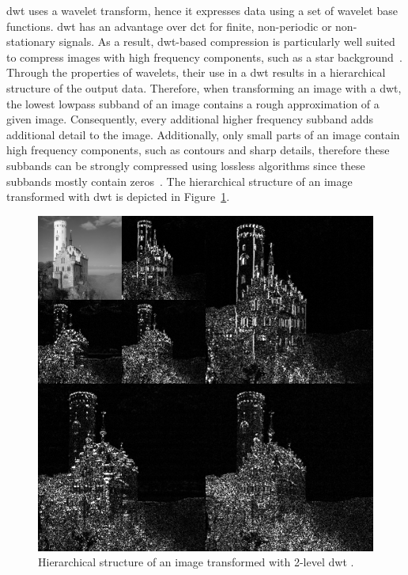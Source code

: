 \Gls{dwt} uses a wavelet transform, hence it expresses data using a set of wavelet base functions. \gls{dwt} has an advantage over \gls{dct} for finite, non-periodic or non-stationary signals. As a result, \gls{dwt}-based compression is particularly well suited to compress images with high frequency components, such as a star background~\cite{Bocharova2009CompressionMultimedia}. Through the properties of wavelets, their use in a \gls{dwt} results in a hierarchical structure of the output data. Therefore, when transforming an image with a \gls{dwt}, the lowest lowpass subband of an image contains a rough approximation of a given image. Consequently, every additional higher frequency subband adds additional detail to the image. Additionally, only small parts of an image contain high frequency components, such as contours and sharp details, therefore these subbands can be strongly compressed using lossless algorithms since these subbands mostly contain zeros~\cite{Bocharova2009CompressionMultimedia}. The hierarchical structure of an image transformed with \gls{dwt} is depicted in Figure~\ref{fig:jp2_hierarchy}.
\begin{figure}[htb]
    \centering
        \includegraphics[width=.7\textwidth]{doc/thesis/0_figures/jp2_jpeg/Jpeg2000_2-level_wavelet_transform-lichtenstein.png}
        \caption{Hierarchical structure of an image transformed with 2-level \gls{dwt} \cite{Commons20192-levelTransform-lichtenstein}.}
        \label{fig:jp2_hierarchy}
\end{figure}

